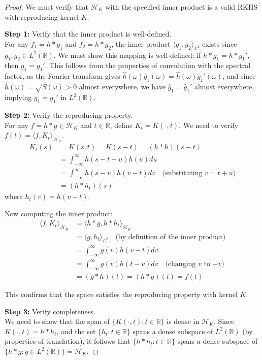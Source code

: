 \documentclass{article}
\begin{document}
\begin{proof}
We must verify that $\mathcal{H}_K$ with the specified inner product is a valid RKHS with reproducing kernel $K$.

\textbf{Step 1:} Verify that the inner product is well-defined.\\
For any $f_1 = h * g_1$ and $f_2 = h * g_2$, the inner product $\langle g_1, g_2 \rangle_{L^2}$ exists since $g_1, g_2 \in L^2(\mathbb{R})$. We must show this mapping is well-defined: if $h * g_1 = h * g_1'$, then $g_1 = g_1'$. This follows from the properties of convolution with the spectral factor, as the Fourier transform gives $\hat{h}(\omega)\hat{g}_1(\omega) = \hat{h}(\omega)\hat{g}_1'(\omega)$, and since $\hat{h}(\omega) = \sqrt{S(\omega)} > 0$ almost everywhere, we have $\hat{g}_1 = \hat{g}_1'$ almost everywhere, implying $g_1 = g_1'$ in $L^2(\mathbb{R})$.

\textbf{Step 2:} Verify the reproducing property.\\
For any $f = h * g \in \mathcal{H}_K$ and $t \in \mathbb{R}$, define $K_t = K(\cdot, t)$. We need to verify $f(t) = \langle f, K_t \rangle_{\mathcal{H}_K}$.
\begin{align}
K_t(s) &= K(s,t) = K(s-t) = (h * h)(s-t)\\
&= \int_{-\infty}^{\infty} h(s-t-u)h(u)du\\
&= \int_{-\infty}^{\infty} h(s-v)h(v-t)dv \quad \text{(substituting $v = t+u$)}\\
&= (h * h_t)(s)
\end{align}
where $h_t(v) = h(v-t)$.

Now computing the inner product:
\begin{align}
\langle f, K_t \rangle_{\mathcal{H}_K} &= \langle h * g, h * h_t \rangle_{\mathcal{H}_K}\\
&= \langle g, h_t \rangle_{L^2} \quad \text{(by definition of the inner product)}\\
&= \int_{-\infty}^{\infty} g(v) h(v-t) dv\\
&= \int_{-\infty}^{\infty} g(v) h(t-v) dv \quad \text{(changing $v$ to $-v$)}\\
&= (g * h)(t) = (h * g)(t) = f(t)
\end{align}

This confirms that the space satisfies the reproducing property with kernel $K$.

\textbf{Step 3:} Verify completeness.\\
We need to show that the span of $\{K(\cdot,t) : t \in \mathbb{R}\}$ is dense in $\mathcal{H}_K$. Since $K(\cdot,t) = h * h_t$, and the set $\{h_t : t \in \mathbb{R}\}$ spans a dense subspace of $L^2(\mathbb{R})$ (by properties of translation), it follows that $\{h * h_t : t \in \mathbb{R}\}$ spans a dense subspace of $\{h * g : g \in L^2(\mathbb{R})\} = \mathcal{H}_K$.
\end{proof}
\end{document}
